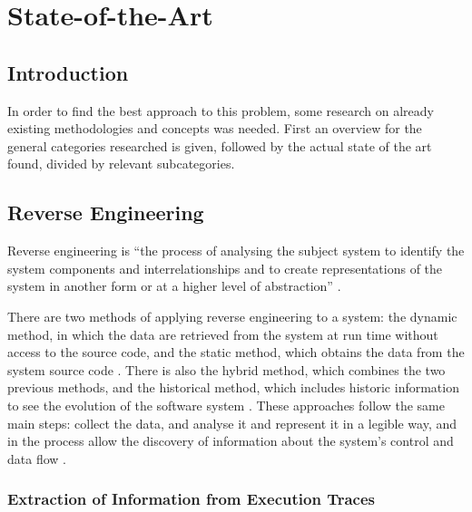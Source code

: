 \chapter{State-of-the-Art} \label{chap:sota}

\section*{}

\section{Introduction}
In order to find the best approach to this problem, some research on already existing methodologies and concepts was needed. First an overview for the general categories researched is given, followed by the actual state of the art found, divided by relevant subcategories. 

\section{Reverse Engineering}\label{sec:reverseengineering}

Reverse engineering is “the process of analysing the subject system to identify the system components and interrelationships and to create representations of the system in another form or at a higher level of abstraction” \cite{chikofsky1990reverse}.

There are two methods of applying reverse engineering to a system: the dynamic method, in which the data are retrieved from the system at run time without access to the source code, and the static method, which obtains the data from the system source code \cite{systa1999dynamic}. There is also the hybrid method, which combines the two previous methods, and the historical method, which includes historic information to see the evolution of the software system \cite{canfora2011achievements}. These approaches follow the same main steps: collect the data, and analyse it and represent it in a legible way, and in the process allow the discovery of information about the system's control and data flow \cite{pacione2003comparative}.

\subsection{Extraction of Information from Execution Traces} \label{sec:extractexecutiontraces}

